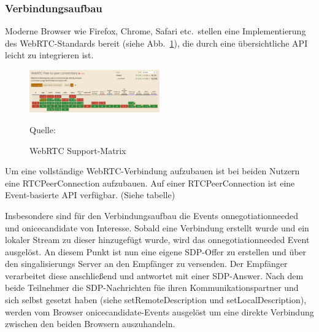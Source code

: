 \documentclass{article}
\newcommand{\figuresource}[1]{
	\begin{center}Quelle: #1\end{center}
}
\begin{document}
\begin{onecolumn}

\subsubsection{Verbindungsaufbau}\label{browser-webrtc}

Moderne Browser wie Firefox, Chrome, Safari etc.\ stellen eine Implementierung
des WebRTC-Standards bereit (siehe Abb.~\ref{fig:webrtc-support}), die
durch eine übersichtliche API leicht zu integrieren ist. %

\begin{figure}[ht]
	\includegraphics[width=0.5\textwidth]{webrtc-support}
	\centering
	\caption[WebRTC Support-Matrix~\cite{WebRTCSupport}]{WebRTC Support-Matrix}\label{fig:webrtc-support}
	\figuresource{\cite{WebRTCSupport}}
\end{figure}

Um eine vollständige WebRTC-Verbindung aufzubauen ist bei beiden Nutzern eine
RTCPeerConnection aufzubauen. Auf einer RTCPeerConnection ist eine
Event-basierte API verfügbar. (Siehe tabelle)


Insbesondere sind für den Verbindungsaufbau die Events onnegotiationneeded und
onicecandidate von Interesse. Sobald eine Verbindung erstellt wurde und ein
lokaler Stream zu dieser hinzugefügt wurde, wird das onnegotiationneeded Event
ausgelöst. An diesem Punkt ist nun eine eigene SDP-Offer zu erstellen und über
den singalisierungs Server an den Empfänger zu versenden. Der Empfänger
verarbeitet diese anschließend und antwortet mit einer SDP-Answer. Nach dem
beide Teilnehmer die SDP-Nachrichten füe ihren Kommunikationspartner und sich
selbst gesetzt haben (siehe setRemoteDescription und setLocalDescription),
werden vom Browser onicecandidate-Events ausgelöst um eine direkte Verbindung
zwischen den beiden Browsern auszuhandeln.



\end{onecolumn}
\end{document}
